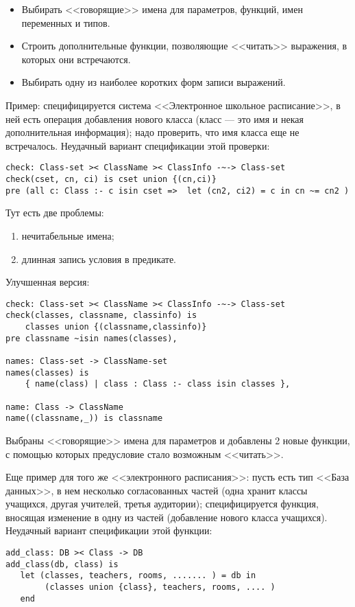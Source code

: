 \documentclass[14pt, twoside]{extreport}
\begin{document}
\begin{itemize}
    \item Выбирать <<говорящие>> имена для параметров, функций, имен переменных и типов.
    \item Строить дополнительные функции, позволяющие <<читать>> выражения, в которых они встречаются.
    \item Выбирать одну из наиболее коротких форм записи выражений.
\end{itemize}

Пример: специфицируется система <<Электронное школьное расписание>>, в ней есть операция добавления нового класса (класс --- это имя и некая дополнительная информация); надо проверить, что имя класса еще не встречалось. Неудачный вариант спецификации этой проверки:
\begin{lstlisting}
check: Class-set >< ClassName >< ClassInfo -~-> Class-set
check(cset, cn, ci) is cset union {(cn,ci)}
pre (all c: Class :- c isin cset =>  let (cn2, ci2) = c in cn ~= cn2 )
\end{lstlisting}

Тут есть две проблемы:
\begin{enumerate}
    \item нечитабельные имена;
    \item длинная запись условия в предикате.
\end{enumerate}

Улучшенная версия:
\begin{lstlisting}
check: Class-set >< ClassName >< ClassInfo -~-> Class-set
check(classes, classname, classinfo) is
    classes union {(classname,classinfo)}
pre classname ~isin names(classes),

names: Class-set -> ClassName-set
names(classes) is
    { name(class) | class : Class :- class isin classes },

name: Class -> ClassName
name((classname,_)) is classname
\end{lstlisting}

Выбраны <<говорящие>> имена для параметров и добавлены 2 новые функции, с помощью которых предусловие стало возможным <<читать>>.

Еще пример для того же <<электронного расписания>>: пусть есть тип <<База данных>>, в нем несколько согласованных частей (одна хранит классы учащихся, другая учителей, третья аудитории); специфицируется функция, вносящая изменение в одну из частей (добавление нового класса учащихся). Неудачный вариант спецификации этой функции:
\begin{lstlisting}
add_class: DB >< Class -> DB
add_class(db, class) is
   let (classes, teachers, rooms, ....... ) = db in
        (classes union {class}, teachers, rooms, .... )
   end
\end{lstlisting}
\end{document}
